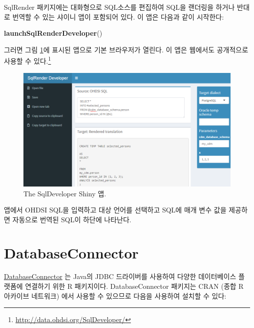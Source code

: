 \documentclass[11pt]{book}
\newenvironment{Shaded}{\begin{snugshade}}{\end{snugshade}}
\newcommand{\KeywordTok}[1]{\textcolor[rgb]{0.13,0.29,0.53}{\textbf{#1}}}
\newcommand{\NormalTok}[1]{#1}
\let\rmarkdownfootnote\footnote%
\def\footnote{\protect\rmarkdownfootnote}
\theoremstyle{definition}
\theoremstyle{definition}
\theoremstyle{definition}
\theoremstyle{remark}
\begin{document}
SqlRender 패키지에는 대화형으로 SQL소스를 편집하여 SQL을 랜더링을 하거나
반대로 번역할 수 있는 샤이니 앱이 포함되어 있다. 이 앱은 다음과 같이
시작한다:

\begin{Shaded}
\begin{Highlighting}[]
\KeywordTok{launchSqlRenderDeveloper}\NormalTok{()}
\end{Highlighting}
\end{Shaded}

그러면 그림 \ref{fig:sqlDeveloper}에 표시된 앱으로 기본 브라우저가
열린다. 이 앱은 웹에서도 공개적으로 사용할 수 있다.\footnote{\url{http://data.ohdsi.org/SqlDeveloper/}}

\begin{figure}

{\centering \includegraphics[width=1\linewidth]{images/SqlAndR/sqlDeveloper} 

}

\caption{The SqlDeveloper Shiny 앱.}\label{fig:sqlDeveloper}
\end{figure}

앱에서 OHDSI SQL을 입력하고 대상 언어를 선택하고 SQL에 매개 변수 값을
제공하면 자동으로 번역된 SQL이 하단에 나타난다.

\hypertarget{DatabaseConnector}{\section{DatabaseConnector}\label{DatabaseConnector}}

\href{https://ohdsi.github.io/DatabaseConnector/}{DatabaseConnector} 는
Java의 JDBC 드라이버를 사용하여 다양한 데이터베이스 플랫폼에 연결하기
위한 R 패키지이다. DatabaseConnector 패키지는 CRAN (종합 R 아카이브
네트워크) 에서 사용할 수 있으므로 다음을 사용하여 설치할 수 있다:
\end{document}
